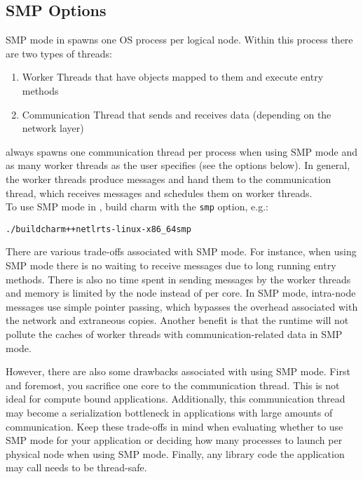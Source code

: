 \subsection{SMP Options}

SMP mode in \charmpp{} spawns one OS process per logical node. Within this
process there are two types of threads:

\begin{enumerate}

\item Worker Threads that have objects mapped to them and execute entry methods

\item Communication Thread that sends and receives data (depending on the
network layer)

\end{enumerate}

\charmpp{} always spawns one communication thread per process when using SMP
mode and as many worker threads as the user specifies (see the options below).
In general, the worker threads produce messages and hand them to the communication
thread, which receives messages and schedules them on worker threads. \\


To use SMP mode in \charmpp{}, build charm with the \texttt{smp} option, e.g.:

\begin{alltt}
./build charm++ netlrts-linux-x86\_64 smp
\end{alltt}

There are various trade-offs associated with SMP mode. For instance, when using
SMP mode there is no waiting to receive messages due to
long running entry methods. There is also no time spent in sending messages by
the worker threads and memory is limited by the node instead of per core.
In SMP mode, intra-node messages use simple pointer passing, which
bypasses the overhead associated with the network and extraneous copies.
Another benefit is that the runtime will not pollute the caches of worker
threads with communication-related data in SMP mode.

However, there are also some drawbacks associated with using SMP mode. First and
foremost, you sacrifice one core to the communication thread. This is not ideal
for compute bound applications. Additionally, this communication thread may
become a serialization bottleneck in applications with large amounts of
communication. Keep these trade-offs in mind when evaluating whether to use SMP
mode for your application or deciding how many processes to launch per physical
node when using SMP mode.
Finally, any library code the application may call needs to be thread-safe.

